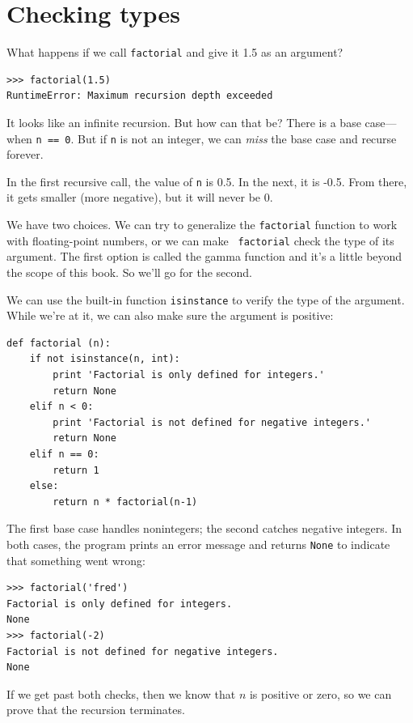\documentclass[10pt]{book}
\begin{document}
\section{Checking types}
\label{guardian}

What happens if we call {\tt factorial} and give it 1.5 as an argument?

\begin{verbatim}
>>> factorial(1.5)
RuntimeError: Maximum recursion depth exceeded
\end{verbatim}
%
It looks like an infinite recursion.  But how can that be?  There is a
base case---when {\tt n == 0}.  But if {\tt n} is not an integer,
we can {\em miss} the base case and recurse forever.

In the first recursive call, the value of {\tt n} is 0.5.
In the next, it is -0.5.  From there, it gets smaller
(more negative), but it will never be 0.

We have two choices.  We can try to generalize the {\tt factorial}
function to work with floating-point numbers, or we can make {\tt
  factorial} check the type of its argument.  The first option is
called the gamma function and it's a
little beyond the scope of this book.  So we'll go for the second.

We can use the built-in function {\tt isinstance} to verify the type
of the argument.  While we're at it, we can also make sure the
argument is positive:

\begin{verbatim}
def factorial (n):
    if not isinstance(n, int):
        print 'Factorial is only defined for integers.'
        return None
    elif n < 0:
        print 'Factorial is not defined for negative integers.'
        return None
    elif n == 0:
        return 1
    else:
        return n * factorial(n-1)
\end{verbatim}
%
The first base case handles nonintegers; the
second catches negative integers.  In both cases, the program prints
an error message and returns {\tt None} to indicate that something
went wrong:

\begin{verbatim}
>>> factorial('fred')
Factorial is only defined for integers.
None
>>> factorial(-2)
Factorial is not defined for negative integers.
None
\end{verbatim}
% 
If we get past both checks, then we know that $n$ is positive or
zero, so we can prove that the recursion terminates.
\end{document}

